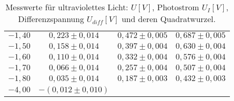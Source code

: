 \begin{table}[h!]
\begin{tabular}{c | ccc}
    $-1,40$ & $0,223 \pm 0,014$ & $0,472 \pm 0,005$ & $0,687 \pm 0,005$ \\
    $-1,50$ & $0,158 \pm 0,014$ & $0,397 \pm 0,004$ & $0,630 \pm 0,004$ \\
    $-1,60$ & $0,110 \pm 0,014$ & $0,332 \pm 0,004$ & $0,576 \pm 0,004$ \\
    $-1,70$ & $0,066 \pm 0,014$ & $0,257 \pm 0,004$ & $0,507 \pm 0,004$ \\
    $-1,80$ & $0,035 \pm 0,014$ & $0,187 \pm 0,003$ & $0,432 \pm 0,003$ \\
    $-4,00$ & $-(0,012 \pm 0,010)$ & & \\
    \hline
    \end{tabular}
    \caption{Messwerte für ultraviolettes Licht: $U [V]$, Photostrom $U_I [V]$, Differenzspannung $U_{diff} [V]$ und deren Quadratwurzel.}
    \label{tab:uv_values}
\end{table}

\newpage

